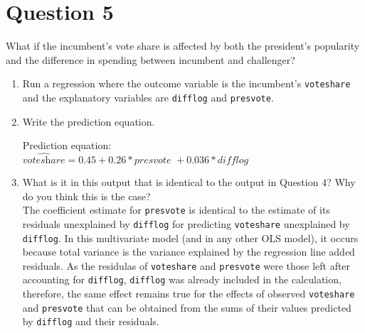 \documentclass[12pt,letterpaper]{article}
\begin{document}
	\newpage	

\section*{Question 5}
\noindent What if the incumbent's vote share is affected by both the president's popularity and the difference in spending between incumbent and challenger? 
	\begin{enumerate}
		\item Run a regression where the outcome variable is the incumbent's \texttt{voteshare} and the explanatory variables are \texttt{difflog} and \texttt{presvote}.	\vspace{.2cm}
			  
		\item Write the prediction equation.	\vspace{.2cm}
					  
						
					Prediction equation: \\
					$\widehat{\textit{voteshare}} = 0.45 + 0.26*\textit{presvote } + 0.036*\textit{difflog}$	\\
		\item What is it in this output that is identical to the output in Question 4? Why do you think this is the case? \\
		The coefficient estimate for \texttt{presvote} is identical to the estimate of its residuals unexplained by \texttt{difflog} for predicting \texttt{voteshare} unexplained by \texttt{difflog}. In this multivariate model (and in any other OLS model), it occurs because total variance is the variance explained by the regression line added residuals. As the residulas of  \texttt{voteshare} and \texttt{presvote} were those left after accounting for  \texttt{difflog}, \texttt{difflog} was already included in the calculation, therefore, the same effect remains true for the effects of observed  \texttt{voteshare} and \texttt{presvote} that can be obtained from the sums of their values predicted by  \texttt{difflog} and their residuals.
	\end{enumerate}
\end{document}
